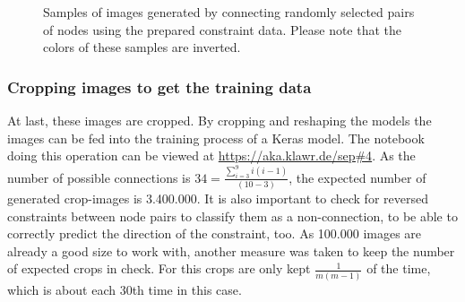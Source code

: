 \begin{figure}
\begin{subfigure}[b]{0.19\textwidth}
    \end{subfigure}
    \begin{subfigure}[b]{0.19\textwidth}
    \end{subfigure}
    \caption[Randomly connected nodes using constraint data]{Samples of images generated by connecting randomly selected pairs of nodes using the prepared constraint data. Please note that the colors of these samples are inverted.}\label{fig:constraint_data_step2}
\end{figure}

\subsubsection{Cropping images to get the training data}\label{ch:cropping_images}

At last, these images are cropped.
By cropping and reshaping the models the images can be fed into the training process of a Keras model.
The notebook doing this operation can be viewed at \url{https://aka.klawr.de/sep\#4}.
As the number of possible connections is \(34 = \frac{\sum_{i=3}^{9}i(i-1)}{(10-3)}\), the expected number of generated crop-images is 3.400.000.
It is also important to check for reversed constraints between node pairs to classify them as a non-connection, to be able to correctly predict the direction of the constraint, too.
As 100.000 images are already a good size to work with, another measure was taken to keep the number of expected crops in check.
For this crops are only kept \(\frac{1}{m(m-1)}\) of the time, which is about each 30th time in this case.

